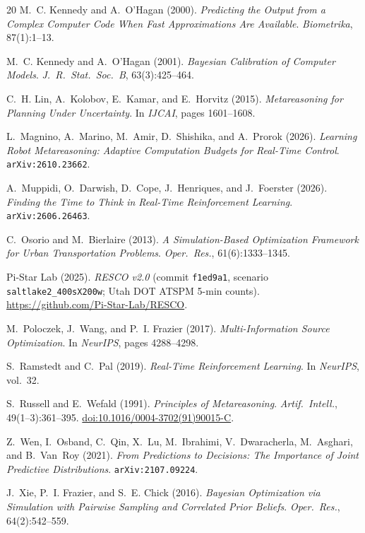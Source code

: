 \begin{thebibliography}{20}
M.~C. Kennedy and A.~O'Hagan (2000). \emph{Predicting the Output from a Complex Computer Code When Fast Approximations Are Available}. \emph{Biometrika}, 87(1):1--13.

M.~C. Kennedy and A.~O'Hagan (2001). \emph{Bayesian Calibration of Computer Models}. \emph{J.\ R.\ Stat.\ Soc.\ B}, 63(3):425--464.

C.~H. Lin, A.~Kolobov, E.~Kamar, and E.~Horvitz (2015). \emph{Metareasoning for Planning Under Uncertainty}. In \emph{IJCAI}, pages 1601--1608.

L.~Magnino, A.~Marino, M.~Amir, D.~Shishika, and A.~Prorok (2026). \emph{Learning Robot Metareasoning: Adaptive Computation Budgets for Real-Time Control}. \texttt{arXiv:2610.23662}.

A.~Muppidi, O.~Darwish, D.~Cope, J.~Henriques, and J.~Foerster (2026). \emph{Finding the Time to Think in Real-Time Reinforcement Learning}. \texttt{arXiv:2606.26463}.

C.~Osorio and M.~Bierlaire (2013). \emph{A Simulation-Based Optimization Framework for Urban Transportation Problems}. \emph{Oper.\ Res.}, 61(6):1333--1345.

Pi-Star Lab (2025). \emph{RESCO v2.0} (commit \texttt{f1ed9a1}, scenario \texttt{saltlake2\_400sX200w}; Utah DOT ATSPM 5-min counts). \url{https://github.com/Pi-Star-Lab/RESCO}.

M.~Poloczek, J.~Wang, and P.~I. Frazier (2017). \emph{Multi-Information Source Optimization}. In \emph{NeurIPS}, pages 4288--4298.

S.~Ramstedt and C.~Pal (2019). \emph{Real-Time Reinforcement Learning}. In \emph{NeurIPS}, vol.~32.

S.~Russell and E.~Wefald (1991). \emph{Principles of Metareasoning}. \emph{Artif.\ Intell.}, 49(1--3):361--395. \href{https://doi.org/10.1016/0004-3702(91)90015-C}{doi:10.1016/0004-3702(91)90015-C}.

Z.~Wen, I.~Osband, C.~Qin, X.~Lu, M.~Ibrahimi, V.~Dwaracherla, M.~Asghari, and B.~Van~Roy (2021). \emph{From Predictions to Decisions: The Importance of Joint Predictive Distributions}. \texttt{arXiv:2107.09224}.

J.~Xie, P.~I. Frazier, and S.~E. Chick (2016). \emph{Bayesian Optimization via Simulation with Pairwise Sampling and Correlated Prior Beliefs}. \emph{Oper.\ Res.}, 64(2):542--559.

\end{thebibliography}
\endgroup
